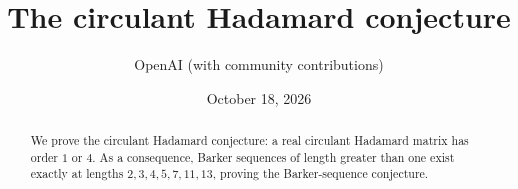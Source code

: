 \documentclass[11pt]{article}
\title{The circulant Hadamard conjecture}
\author{OpenAI (with community contributions)}
\date{October 18, 2026}
\begin{document}
\maketitle
\begin{abstract}
We prove the circulant Hadamard conjecture: a real circulant Hadamard
matrix has order $1$ or $4$. As a consequence, Barker sequences of
length greater than one exist exactly at lengths $2,3,4,5,7,11,13$,
proving the Barker-sequence conjecture.
\end{abstract}






\begingroup
\RaggedRight

\endgroup
\end{document}

